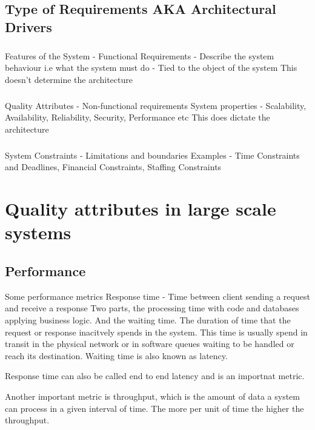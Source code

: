 \documentclass[a4paper, 11pt]{book}
\begin{document}
    \section{Type of Requirements AKA Architectural Drivers}

    \paragraph{}
    Features of the System - Functional Requirements - Describe the system behaviour i.e what the system must do - Tied to the object of the system
    This doesn't determine the architecture

    \paragraph{}
    Quality Attributes - Non-functional requirements
    System properties - Scalability, Availability, Reliability, Security, Performance etc
    This does dictate the architecture

    \paragraph{}
    System Constraints - Limitations and boundaries
    Examples - Time Constraints and Deadlines, Financial Constraints, Staffing Constraints


    \chapter{Quality attributes in large scale systems}


    \section{Performance}
    Some performance metrics
    Response time - Time between client sending a request and receive a response
    Two parts, the processing time with code and databases applying business logic.
    And the waiting time.
    The duration of time that the request or response inacitvely spends in the system.
    This time is usually spend in transit in the physical network or in software queues waiting to be handled or reach its destination.
    Waiting time is also known as latency.

    Response time can also be called end to end latency and is an importnat metric.

    Another important metric is throughput, which is the amount of data a system can process in a given interval of time.
    The more per unit of time the higher the throughput.
\end{document}
